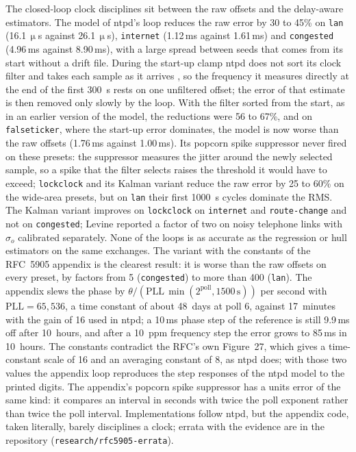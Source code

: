 \documentclass[11pt,a4paper]{article}
\newcommand{\micro}{\ensuremath{\upmu}}
\newcommand{\us}{\,\micro s}
\newcommand{\ms}{\,ms}
\begin{document}
The closed-loop clock disciplines sit between the raw offsets and the delay-aware estimators. The
model of ntpd's loop reduces the raw error by 30 to 45\% on \texttt{lan} (16.1\us{} against 26.1\us),
\texttt{internet} (1.12\ms{} against 1.61\ms) and \texttt{congested} (4.96\ms{} against 8.90\ms), with a
large spread between seeds that comes from its start without a drift file. During the start-up clamp
ntpd does not sort its clock filter and takes each sample as it arrives \citep{ntpproto}, so the
frequency it measures directly at the end of the first 300~s rests on one unfiltered offset; the error
of that estimate is then removed only slowly by the loop. With the filter sorted from the start, as in
an earlier version of the model, the reductions were 56 to 67\%, and on \texttt{falseticker}, where
the start-up error dominates, the model is now worse than the raw offsets (1.76\ms{} against
1.00\ms). Its popcorn spike suppressor never fired on these presets: the suppressor measures the jitter
around the newly selected sample, so a spike that the filter selects raises the threshold it would
have to exceed; \texttt{lockclock} and its Kalman variant reduce the raw error by 25 to 60\% on the
wide-area presets, but on \texttt{lan} their first 1000~s cycles dominate the RMS. The Kalman variant improves on \texttt{lockclock} on
\texttt{internet} and \texttt{route-change} and not on \texttt{congested}; Levine reported a factor of two on
noisy telephone links with $\sigma_o$ calibrated separately. None of the loops is as accurate as the regression or hull estimators on the same exchanges. The variant with the constants of the RFC~5905
appendix is the clearest result: it is worse than the raw offsets on every preset, by factors from
5 (\texttt{congested}) to more than 400 (\texttt{lan}). The appendix slews the phase by $\theta/(\mathrm{PLL}\,\min(2^{\mathrm{poll}}, 1500\,\mathrm{s}))$
per second with $\mathrm{PLL} = 65{,}536$, a time constant of about 48~days at poll 6, against 17~minutes
with the gain of 16 used in ntpd; a 10\ms{} phase step of the reference is still 9.9\ms{} off after
10~hours, and after a 10~ppm frequency step the error grows to 85\ms{} in 10~hours. The constants
contradict the RFC's own Figure~27, which gives a time-constant scale of 16 and an averaging constant
of 8, as ntpd does; with those two values the appendix loop reproduces the step responses of the ntpd
model to the printed digits. The appendix's popcorn spike suppressor
has a units error of the same kind: it compares an interval in seconds with twice the poll exponent
rather than twice the poll interval. Implementations follow ntpd, but the appendix code, taken
literally, barely disciplines a clock; errata with the evidence are in the repository
(\texttt{research/rfc5905-errata}).
\end{document}
